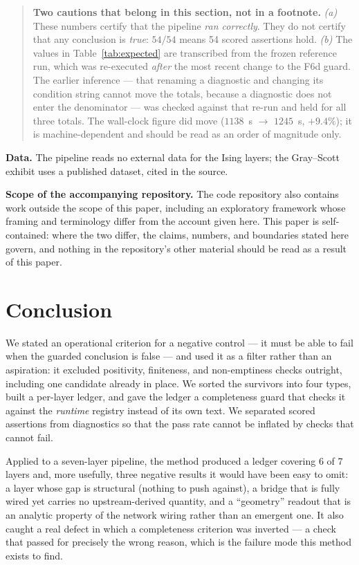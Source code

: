 \documentclass[11pt,a4paper]{article}
\begin{document}
\begin{quote}
\textbf{Two cautions that belong in this section, not in a footnote.}
\emph{(a)} These numbers certify that the pipeline \emph{ran correctly}. They do not
certify that any conclusion is \emph{true}: $54/54$ means 54 scored assertions hold.
\emph{(b)} The values in Table~\ref{tab:expected} are transcribed from the frozen
reference run, which was re-executed \emph{after} the most recent change to the F6d
guard. The earlier inference --- that renaming a diagnostic and changing its
condition string cannot move the totals, because a diagnostic does not enter the
denominator --- was checked against that re-run and held for all three totals. The
wall-clock figure did move ($1138$~s $\rightarrow$ $1245$~s, $+9.4\%$); it is
machine-dependent and should be read as an order of magnitude only.
\end{quote}

\textbf{Data.} The pipeline reads no external data for the Ising layers; the
Gray--Scott exhibit uses a published dataset, cited in the source.

\textbf{Scope of the accompanying repository.} The code repository also contains
work outside the scope of this paper, including an exploratory framework whose
framing and terminology differ from the account given here. This paper is
self-contained: where the two differ, the claims, numbers, and boundaries stated
here govern, and nothing in the repository's other material should be read as a
result of this paper.

\section{Conclusion}
\label{sec:conclusion}

We stated an operational criterion for a negative control --- it must be able to
fail when the guarded conclusion is false --- and used it as a filter rather than an
aspiration: it excluded positivity, finiteness, and non-emptiness checks outright,
including one candidate already in place. We sorted the survivors into four types,
built a per-layer ledger, and gave the ledger a completeness guard that checks it
against the \emph{runtime} registry instead of its own text. We separated scored
assertions from diagnostics so that the pass rate cannot be inflated by checks that
cannot fail.

Applied to a seven-layer pipeline, the method produced a ledger covering 6 of 7
layers and, more usefully, three negative results it would have been easy to omit:
a layer whose gap is structural (nothing to push against), a bridge that is fully
wired yet carries no upstream-derived quantity, and a ``geometry'' readout that is
an analytic property of the network wiring rather than an emergent one. It also
caught a real defect in which a completeness criterion was inverted --- a check that
passed for precisely the wrong reason, which is the failure mode this method exists
to find.
\end{document}

